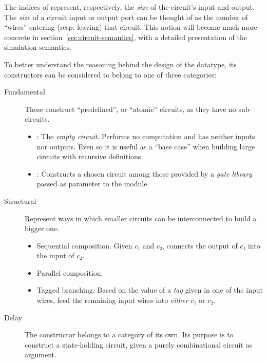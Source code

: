         The indices of  represent, respectively, the \emph{size} of the circuit's input and output.
        The \emph{size} of a circuit input or output port can be thought of
        as the number of ``wires'' entering (resp. leaving) that circuit.
        This notion will become much more concrete in section~\ref{sec:circuit-semantics}, with
        a detailed presentation of the simulation semantics.

        To better understand the reasoning behind the design of the  datatype,
        its constructors can be considered to belong to one of three categories:

        \begin{description}
            \item[Fundamental] These construct ``predefined'', or ``atomic'' circuits, as they have no sub-circuits.
                \begin{itemize}
                    \item {}: The \emph{empty circuit}. Performs no computation and has neither inputs nor outputs.
                        Even so it is useful as a ``base case'' when building large circuits with recursive definitions.
                    \item {}: Constructs a chosen circuit among those provided by a \emph{gate library}
                        passed as parameter to the  module.
                \end{itemize}
            \item[Structural] Represent ways in which smaller circuits can be interconnected to build a bigger one.
                \begin{itemize}
                    \item {} Sequential composition.
                        Given $c₁$ and $c₂$, connects the output of $c₁$ into the input of $c₂$.
                    \item {} Parallel composition.
                    \item {} Tagged branching.
                        Based on the value of a \emph{tag} given in one of the input wires,
                        feed the remaining input wires into \emph{either} $c₁$ or $c₂$.
                \end{itemize}
            \item[Delay]
                The  constructor belongs to a category of its own.
                Its purpose is to construct a state-holding circuit, given a purely combinational circuit as argument.
        \end{description}

